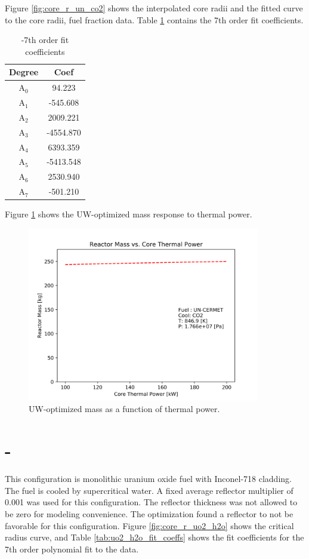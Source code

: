 Figure \ref{fig:core_r_un_co2} shows the interpolated core radii and the fitted
curve to the core radii, fuel fraction data. Table \ref{tab:un_co2_fit_coeffs}
contains the 7th order fit coefficients.

\begin{table}[h]
  \centering
  \caption{\uox-\codiox 7th order fit coefficients}
  \begin{tabular}{cc}
    \toprule
     Degree & Coef\\ 
    \midrule                                  
    A$_0$  &  94.223\\
    A$_1$  &  -545.608\\
    A$_2$  &  2009.221\\
    A$_3$  &  -4554.870\\
    A$_4$  &  6393.359\\
    A$_5$  &  -5413.548\\
    A$_6$  &  2530.940\\
    A$_7$  &  -501.210\\
  \end{tabular}
  \label{tab:un_co2_fit_coeffs}
\end{table}

Figure \ref{fig:mass_un_co2} shows the UW-\codiox optimized mass response to thermal
power.

\begin{figure}[h]
    \centering
    \includegraphics[width=4in]{../images/mass_vs_q_un_co2.png}
\caption{UW-\codiox optimized mass as a function of thermal power.}
\label{fig:mass_un_co2}
\end{figure}

\clearpage
\section{\uox-\water}
This configuration is monolithic uranium oxide fuel with Inconel-718 cladding.
The fuel is cooled by supercritical water. A fixed average reflector multiplier
of 0.001 was used for this configuration. The reflector thickness was not
allowed to be zero for modeling convenience. The optimization found a
reflector to not be favorable for this configuration. Figure
\ref{fig:core_r_uo2_h2o} shows the critical radius curve, and Table
\ref{tab:uo2_h2o_fit_coeffs} shows the fit coefficients for the 7th order
polynomial fit to the data.

